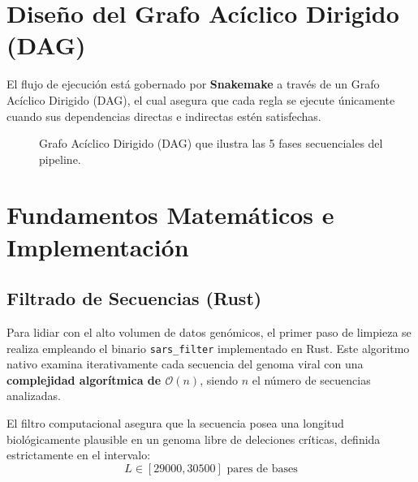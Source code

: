 \documentclass[11pt,a4paper]{article}
\begin{document}
\section{Diseño del Grafo Acíclico Dirigido (DAG)}
El flujo de ejecución está gobernado por \textbf{Snakemake} a través de un Grafo Acíclico Dirigido (DAG), el cual asegura que cada regla se ejecute únicamente cuando sus dependencias directas e indirectas estén satisfechas.

\begin{figure}[htbp]
    \centering
    \caption{Grafo Acíclico Dirigido (DAG) que ilustra las 5 fases secuenciales del pipeline.}
    \label{fig:dag_pipeline}
\end{figure}

\section{Fundamentos Matemáticos e Implementación}

\subsection{Filtrado de Secuencias (Rust)}
Para lidiar con el alto volumen de datos genómicos, el primer paso de limpieza se realiza empleando el binario \texttt{sars\_filter} implementado en Rust. Este algoritmo nativo examina iterativamente cada secuencia del genoma viral con una \textbf{complejidad algorítmica de $\mathcal{O}(n)$}, siendo $n$ el número de secuencias analizadas.

El filtro computacional asegura que la secuencia posea una longitud biológicamente plausible en un genoma libre de deleciones críticas, definida estrictamente en el intervalo:
\begin{equation}
    L \in [29000, 30500] \text{ pares de bases}
\end{equation}
\end{document}
